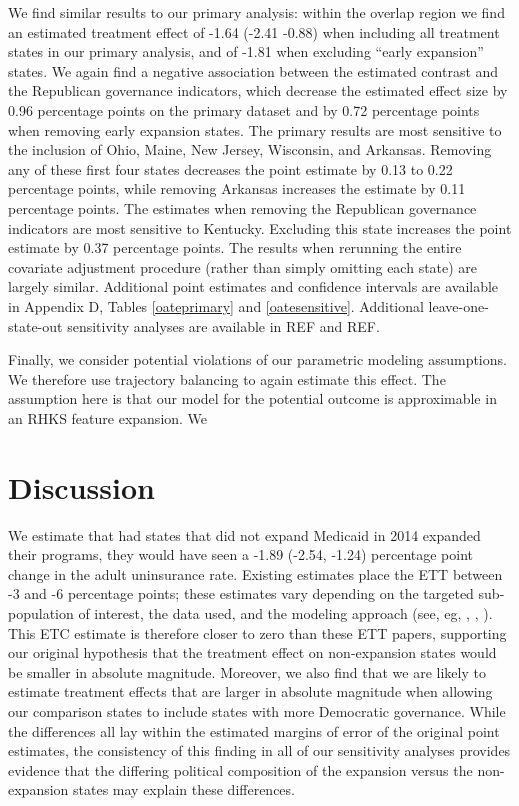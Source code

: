 \documentclass[12pt]{article}
\begin{document}
We find similar results to our primary analysis: within the overlap region we find an estimated treatment effect of -1.64 (-2.41 -0.88) when including all treatment states in our primary analysis, and of -1.81 when excluding ``early expansion'' states. We again find a negative association between the estimated contrast and the Republican governance indicators, which decrease the estimated effect size by 0.96 percentage points on the primary dataset and by 0.72 percentage points when removing early expansion states. The primary results are most sensitive to the inclusion of Ohio, Maine, New Jersey, Wisconsin, and Arkansas. Removing any of these first four states decreases the point estimate by 0.13 to 0.22 percentage points, while removing Arkansas increases the estimate by 0.11 percentage points. The estimates when removing the Republican governance indicators are most sensitive to Kentucky. Excluding this state increases the point estimate by 0.37 percentage points. The results when rerunning the entire covariate adjustment procedure (rather than simply omitting each state) are largely similar. Additional point estimates and confidence intervals are available in Appendix D, Tables \ref{oateprimary} and \ref{oatesensitive}. Additional leave-one-state-out sensitivity analyses are available in REF and REF.

Finally, we consider potential violations of our parametric modeling assumptions. We therefore use trajectory balancing to again estimate this effect. The assumption here is that our model for the potential outcome is approximable in an RHKS feature expansion. We 

\section{Discussion}

We estimate that had states that did not expand Medicaid in 2014 expanded their programs, they would have seen a -1.89 (-2.54, -1.24) percentage point change in the adult uninsurance rate. Existing estimates place the ETT between -3 and -6 percentage points; these estimates vary depending on the targeted sub-population of interest, the data used, and the modeling approach (see, eg, \cite{courtemanche2017early}, \cite{kaestner2017effects}, \cite{frean2017premium}). This ETC estimate is therefore closer to zero than these ETT papers, supporting our original hypothesis that the treatment effect on non-expansion states would be smaller in absolute magnitude. Moreover, we also find that we are likely to estimate treatment effects that are larger in absolute magnitude when allowing our comparison states to include states with more Democratic governance. While the differences all lay within the estimated margins of error of the original point estimates, the consistency of this finding in all of our sensitivity analyses provides evidence that the differing political composition of the expansion versus the non-expansion states may explain these differences. 
\end{document}
